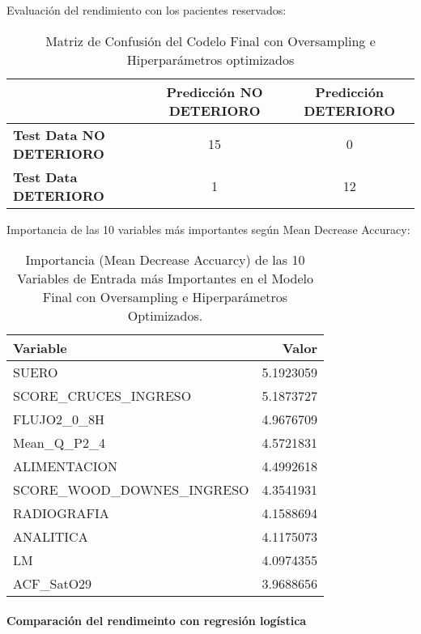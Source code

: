 Evaluación del rendimiento con los pacientes reservados: 

\begin{table}[H]
    \centering
    \begin{tabular}{lcc}
        \toprule
        & \textbf{Predicción NO DETERIORO} & \textbf{Predicción DETERIORO} \\
        \midrule
        \textbf{Test Data NO DETERIORO} & 15 & 0 \\
        \textbf{Test Data DETERIORO} & 1 & 12 \\
        \bottomrule
    \end{tabular}
    \caption{Matriz de Confusión del Codelo Final con Oversampling e Hiperparámetros optimizados}
    \label{tabla:confusion_matrix_final_Hiper}
\end{table}


Importancia de las 10 variables más importantes según Mean Decrease Accuracy:

\begin{table}[H]
    \centering
    \begin{tabular}{|l|r|}
        \hline
        \textbf{Variable} & \textbf{Valor} \\
        \hline
        SUERO & 5.1923059 \\
        SCORE\_CRUCES\_INGRESO & 5.1873727 \\
        FLUJO2\_0\_8H & 4.9676709 \\
        Mean\_Q\_P2\_4 & 4.5721831 \\
        ALIMENTACION & 4.4992618 \\
        SCORE\_WOOD\_DOWNES\_INGRESO & 4.3541931 \\
        RADIOGRAFIA & 4.1588694 \\
        ANALITICA & 4.1175073 \\
        LM & 4.0974355 \\
        ACF\_SatO29 & 3.9688656 \\
        \hline
    \end{tabular}
    \caption{Importancia (Mean Decrease Accuarcy) de las 10 Variables de Entrada más Importantes en el Modelo Final con Oversampling e Hiperparámetros Optimizados.}
    \label{tabla:importancia_variables_modelo_final_Hiper}
\end{table}

\paragraph{Comparación del rendimeinto con regresión logística}

